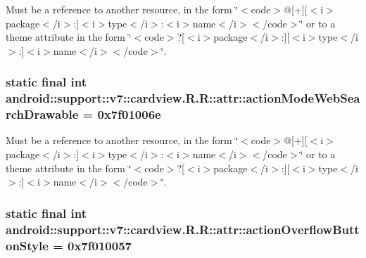 Must be a reference to another resource, in the form \char`\"{}$<$code$>$@\mbox{[}+\mbox{]}\mbox{[}$<$i$>$package$<$/i$>$:\mbox{]}$<$i$>$type$<$/i$>$:$<$i$>$name$<$/i$>$$<$/code$>$\char`\"{} or to a theme attribute in the form \char`\"{}$<$code$>$?\mbox{[}$<$i$>$package$<$/i$>$:\mbox{]}\mbox{[}$<$i$>$type$<$/i$>$:\mbox{]}$<$i$>$name$<$/i$>$$<$/code$>$\char`\"{}. \hypertarget{classandroid_1_1support_1_1v7_1_1cardview_1_1_r_1_1attr_0ddebfd255b4a7bc15dc68810b785063}{
\subsubsection[{actionModeWebSearchDrawable}]{\setlength{\rightskip}{0pt plus 5cm}static final int android::support::v7::cardview.R.R::attr::actionModeWebSearchDrawable = 0x7f01006e}}
\label{classandroid_1_1support_1_1v7_1_1cardview_1_1_r_1_1attr_0ddebfd255b4a7bc15dc68810b785063}


Must be a reference to another resource, in the form \char`\"{}$<$code$>$@\mbox{[}+\mbox{]}\mbox{[}$<$i$>$package$<$/i$>$:\mbox{]}$<$i$>$type$<$/i$>$:$<$i$>$name$<$/i$>$$<$/code$>$\char`\"{} or to a theme attribute in the form \char`\"{}$<$code$>$?\mbox{[}$<$i$>$package$<$/i$>$:\mbox{]}\mbox{[}$<$i$>$type$<$/i$>$:\mbox{]}$<$i$>$name$<$/i$>$$<$/code$>$\char`\"{}. \hypertarget{classandroid_1_1support_1_1v7_1_1cardview_1_1_r_1_1attr_c92ebbbb41d75b788250f593cd9a750e}{
\subsubsection[{actionOverflowButtonStyle}]{\setlength{\rightskip}{0pt plus 5cm}static final int android::support::v7::cardview.R.R::attr::actionOverflowButtonStyle = 0x7f010057}}
\label{classandroid_1_1support_1_1v7_1_1cardview_1_1_r_1_1attr_c92ebbbb41d75b788250f593cd9a750e}


